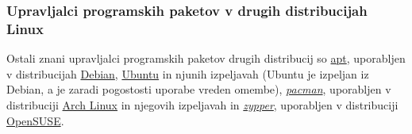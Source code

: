 \subsubsection{Upravljalci programskih paketov v drugih distribucijah Linux}

Ostali znani upravljalci programskih paketov drugih distribucij so
\href{https://ubuntu.com/server/docs/package-management}{apt}, uporabljen v distribucijah
\href{https://www.debian.org/}{Debian}, \href{https://ubuntu.com/}{Ubuntu} in njunih izpeljavah (Ubuntu je izpeljan iz
Debian, a je zaradi pogostosti uporabe vreden omembe), \href{https://wiki.archlinux.org/title/pacman}{\emph{pacman}},
uporabljen v distribuciji \href{https://archlinux.org/}{Arch Linux} in njegovih izpeljavah in
\href{https://en.opensuse.org/Portal:Zypper}{\emph{zypper}}, uporabljen v distribuciji
\href{https://www.opensuse.org/}{OpenSUSE}.